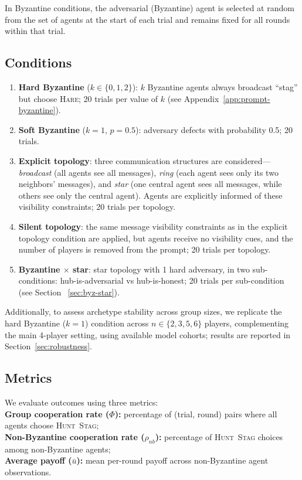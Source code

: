 \documentclass[runningheads]{llncs}
\newcommand{\tsc}[1]{\textsc{#1}}
\begin{document}
In Byzantine conditions, the adversarial (Byzantine) agent is selected at random from the set of agents at the start of each trial and remains fixed for all rounds within that trial.


\subsection{Conditions}
\begin{enumerate}
\item \textbf{Hard Byzantine} ($k \in \{0,1,2\}$): $k$ Byzantine agents always broadcast ``stag'' but choose \tsc{Hare}; 20 trials per value of $k$ (see Appendix~\ref{app:prompt-byzantine}).
\item \textbf{Soft Byzantine} ($k{=}1$, $p{=}0.5$): adversary defects with probability 0.5; 20 trials.
\item \textbf{Explicit topology}: three communication structures are considered---\emph{broadcast} (all agents see all messages), \emph{ring} (each agent sees only its two neighbors' messages), and \emph{star} (one central agent sees all messages, while others see only the central agent). Agents are explicitly informed of these visibility constraints; 20 trials per topology.

\item \textbf{Silent topology}: the same message visibility constraints as in the explicit topology condition are applied, but agents receive no visibility cues, and the number of players is removed from the prompt; 20 trials per topology.
\item \textbf{Byzantine $\times$ star}: star topology with 1 hard adversary, in two sub-conditions: hub-is-adversarial vs hub-is-honest; 20 trials per sub-condition (see Section ~\ref{sec:byz-star}).  
\end{enumerate}



Additionally, to assess archetype stability across group sizes, 
we replicate the hard Byzantine ($k{=}1$) condition across 
$n \in \{2,3,5,6\}$ players, complementing the main 4-player setting, using available model cohorts; 
results are reported in Section~\ref{sec:robustness}.

\subsection{Metrics}
We evaluate outcomes using three metrics: \\
\textbf{Group cooperation rate ($\Phi$):} percentage of (trial, round) pairs where all agents choose \tsc{Hunt~Stag}; \\
\textbf{Non-Byzantine cooperation rate ($\rho_{nb}$):} percentage of \tsc{Hunt~Stag} choices among non-Byzantine agents; \\
\textbf{Average payoff ($\bar{u}$):} mean per-round payoff across non-Byzantine agent observations.
\end{document}
